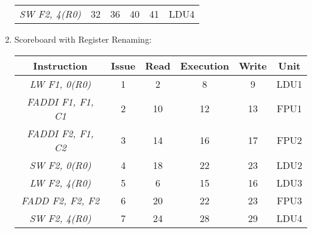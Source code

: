 \begin{enumerate}
\begin{table}[H]
\begin{tabular}{c|cccc|c}
            \textit{SW F2, 4(R0)}     & 32             & 36            & 40                 & 41             & LDU4         
            \end{tabular}
        \end{table}
    \item Scoreboard with Register Renaming: 
        \begin{table}[H]
            \centering
            \begin{tabular}{c|cccc|c}
            \textbf{Instruction}      & \textbf{Issue} & \textbf{Read} & \textbf{Execution} & \textbf{Write} & \textbf{Unit} \\ \hline
            \textit{LW F1, 0(R0)}     & 1              & 2             & 8                  & 9              & LDU1          \\
            \textit{FADDI F1, F1, C1} & 2              & 10            & 12                 & 13             & FPU1          \\
            \textit{FADDI F2, F1, C2} & 3              & 14            & 16                 & 17             & FPU2          \\
            \textit{SW F2, 0(R0)}     & 4              & 18            & 22                 & 23             & LDU2          \\
            \textit{LW F2, 4(R0)}     & 5              & 6             & 15                 & 16             & LDU3          \\
            \textit{FADD F2, F2, F2}  & 6              & 20            & 22                 & 23             & FPU3          \\
            \textit{SW F2, 4(R0)}     & 7              & 24            & 28                 & 29             & LDU4         
            \end{tabular}
        \end{table}
\end{enumerate}